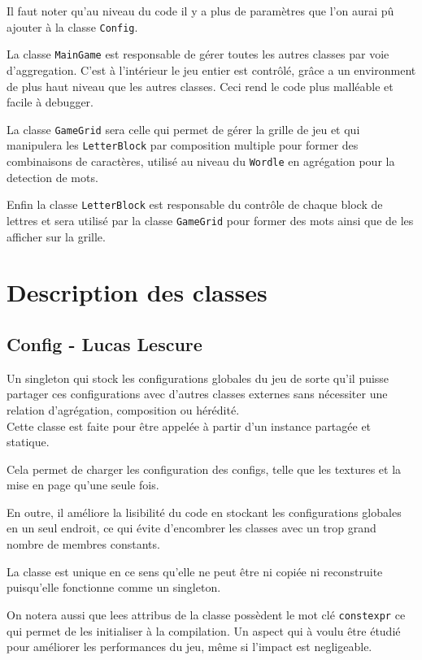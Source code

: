 \documentclass[11pt, openright]{book}
\begin{document}
    Il faut noter qu'au niveau du code il y a plus de paramètres que l'on aurai pû ajouter à la classe \texttt{Config}.

    La classe \texttt{MainGame} est responsable de gérer toutes les autres classes par voie d'aggregation. C'est à l'intérieur le jeu entier est contrôlé, grâce a un environment de plus haut niveau que les autres classes. Ceci rend le code plus malléable et facile à debugger. 

    La classe \texttt{GameGrid} sera celle qui permet de gérer la grille de jeu et qui manipulera les \texttt{Letter\-Block} par composition multiple pour former des combinaisons de caractères, utilisé au niveau du \texttt{Wordle} en agrégation pour la detection de mots. 

    Enfin la classe \texttt{LetterBlock} est responsable du contrôle de chaque block de lettres et sera utilisé par la classe \texttt{GameGrid} pour former des mots ainsi que de les afficher sur la grille.

    \newpage 

    \section{Description des classes}

    \subsection{Config - Lucas Lescure}

    Un singleton qui stock les configurations globales du jeu de sorte qu'il puisse partager ces configurations avec d'autres classes externes sans nécessiter une relation d’agrégation, composition ou hérédité. \\
    Cette classe est faite pour être appelée à partir d'un instance partagée et statique.

    Cela permet de charger les configuration des configs, telle que les textures et la mise en page qu'une seule fois.

    En outre, il améliore la lisibilité du code en stockant les configurations globales en un seul endroit, ce qui évite d'encombrer les classes avec un trop grand nombre de membres constants.

    La classe est unique en ce sens qu'elle ne peut être ni copiée ni reconstruite puisqu'elle fonctionne comme un singleton.

    On notera aussi que lees attribus de la classe possèdent le mot clé \texttt{constexpr} ce qui permet de les initialiser à la compilation. Un aspect qui à voulu être étudié pour améliorer les performances du jeu, même si l'impact est negligeable.
\end{document}
